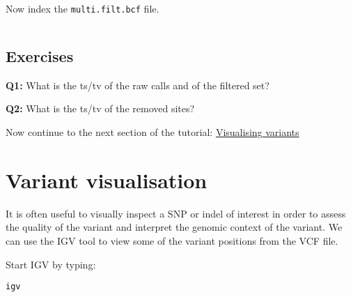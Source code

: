 \documentclass[11pt]{article}
\makeatletter
\newcommand{\boxspacing}{\kern\kvtcb@left@rule\kern\kvtcb@boxsep}
\newcommand{\prompt}[4]{
        {\ttfamily\llap{{\color{#2}[#3]:\hspace{3pt}#4}}\vspace{-\baselineskip}}
    }
\makeatother
\begin{document}
    Now index the \texttt{multi.filt.bcf} file.

    \begin{tcolorbox}[breakable, size=fbox, boxrule=1pt, pad at break*=1mm,colback=cellbackground, colframe=cellborder]
\prompt{In}{incolor}{ }{\boxspacing}
\begin{Verbatim}[commandchars=\\\{\}]

\end{Verbatim}
\end{tcolorbox}

    \hypertarget{exercises}{%
\subsection{Exercises}\label{exercises}}

    \textbf{Q1:} What is the ts/tv of the raw calls and of the filtered set?

    \textbf{Q2:} What is the ts/tv of the removed sites?

    Now continue to the next section of the tutorial:
\href{visualisation.ipynb}{Visualising variants}





\newpage





    \hypertarget{variant-visualisation}{%
\section{Variant visualisation}\label{variant-visualisation}}

It is often useful to visually inspect a SNP or indel of interest in
order to assess the quality of the variant and interpret the genomic
context of the variant. We can use the IGV tool to view some of the
variant positions from the VCF file.

Start IGV by typing:

    \begin{tcolorbox}[breakable, size=fbox, boxrule=1pt, pad at break*=1mm,colback=cellbackground, colframe=cellborder]
\prompt{In}{incolor}{ }{\boxspacing}
\begin{Verbatim}[commandchars=\\\{\}]
igv
\end{Verbatim}
\end{tcolorbox}
\end{document}
